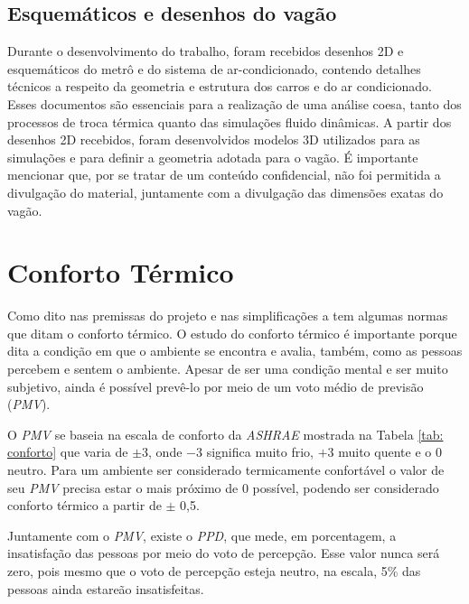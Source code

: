 \documentclass[acronym,symbols,table]{fei}
\begin{document}
\subsection{Esquemáticos e desenhos do vagão} 
    
Durante o desenvolvimento do trabalho, foram recebidos desenhos 2D e esquemáticos do metrô e do sistema de ar-condicionado, contendo detalhes técnicos a respeito da geometria e estrutura dos carros e do ar condicionado. Esses documentos são essenciais para a realização de uma análise coesa, tanto dos processos de troca térmica quanto das simulações fluido dinâmicas. A partir dos desenhos 2D recebidos, foram desenvolvidos modelos 3D utilizados para as simulações e para definir a geometria adotada para o vagão. É importante mencionar que, por se tratar de um conteúdo confidencial, não foi permitida a divulgação do material, juntamente com a divulgação das dimensões exatas do vagão.
 


\section{Conforto Térmico}

Como dito nas premissas do projeto e nas simplificações a \textcite{ASHRAE2009} tem algumas normas que ditam o conforto térmico. O estudo do conforto térmico é importante porque dita a condição em que o ambiente se encontra e avalia, também, como as pessoas percebem e sentem o ambiente. Apesar de ser uma condição mental e ser muito subjetivo, ainda é possível prevê-lo por meio de um voto médio de previsão (\textit{PMV}).

O \textit{PMV} se baseia na escala de conforto da \textit{ASHRAE} mostrada na Tabela \ref{tab: conforto} que varia de $\pm3$, onde $-3$ significa muito frio, $+3$ muito quente e o 0 neutro. Para um ambiente ser considerado termicamente confortável o valor de seu \textit{PMV} precisa estar o mais próximo de 0 possível, podendo ser considerado conforto térmico a partir de $\pm$ 0,5.

Juntamente com o \textit{PMV}, existe o \textit{PPD}, que mede, em porcentagem, a insatisfação das pessoas por meio do voto de percepção. Esse valor nunca será zero, pois mesmo que o voto de percepção esteja neutro, na escala, 5\% das pessoas ainda estareão insatisfeitas.
   
\end{document}

